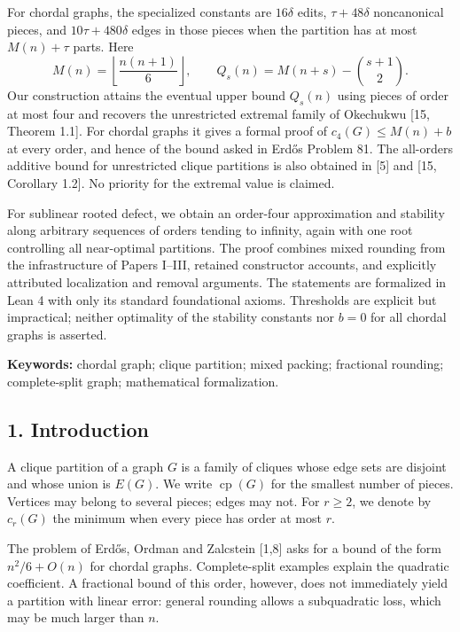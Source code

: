\documentclass[english,11pt,a4paper]{article}
\begin{document}
For chordal graphs, the specialized constants are \(16\delta\) edits, \(\tau+48\delta\) noncanonical pieces, and \(10\tau+480\delta\) edges in those pieces when the partition has at most \(M(n)+\tau\) parts. Here \[
M(n)=\left\lfloor\frac{n(n+1)}6\right\rfloor,\qquad
Q_s(n)=M(n+s)-\binom{s+1}{2}.
\] Our construction attains the eventual upper bound \(Q_s(n)\) using pieces of order at most four and recovers the unrestricted extremal family of Okechukwu {[}15, Theorem 1.1{]}. For chordal graphs it gives a formal proof of \(c_4(G)\le M(n)+b\) at every order, and hence of the bound asked in Erdős Problem 81. The all-orders additive bound for unrestricted clique partitions is also obtained in {[}5{]} and {[}15, Corollary 1.2{]}. No priority for the extremal value is claimed.

For sublinear rooted defect, we obtain an order-four approximation and stability along arbitrary sequences of orders tending to infinity, again with one root controlling all near-optimal partitions. The proof combines mixed rounding from the infrastructure of Papers I--III, retained constructor accounts, and explicitly attributed localization and removal arguments. The statements are formalized in Lean 4 with only its standard foundational axioms. Thresholds are explicit but impractical; neither optimality of the stability constants nor \(b=0\) for all chordal graphs is asserted.

\textbf{Keywords:} chordal graph; clique partition; mixed packing; fractional rounding; complete-split graph; mathematical formalization.

\subsection{1. Introduction}\label{introduction}

A clique partition of a graph \(G\) is a family of cliques whose edge sets are disjoint and whose union is \(E(G)\). We write \(\operatorname{cp}(G)\) for the smallest number of pieces. Vertices may belong to several pieces; edges may not. For \(r\ge2\), we denote by \(c_r(G)\) the minimum when every piece has order at most \(r\).

The problem of Erdős, Ordman and Zalcstein {[}1,8{]} asks for a bound of the form \(n^2/6+O(n)\) for chordal graphs. Complete-split examples explain the quadratic coefficient. A fractional bound of this order, however, does not immediately yield a partition with linear error: general rounding allows a subquadratic loss, which may be much larger than \(n\).
\end{document}
